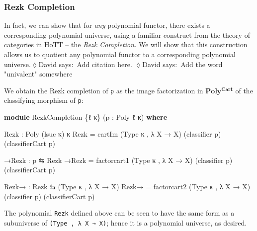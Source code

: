 \documentclass[
  11pt,
  oneside,
  article]{memoir}
\newenvironment{Shaded}{}{}
\newcommand{\KeywordTok}[1]{\textcolor[rgb]{0.00,0.44,0.13}{\textbf{#1}}}
\newcommand{\NormalTok}[1]{#1}
\newcommand{\OtherTok}[1]{\textcolor[rgb]{0.00,0.44,0.13}{#1}}
\theoremstyle{definition}
\theoremstyle{plain}
\newcommand{\0}{\textsf{0}}
\newcommand{\1}{\tn{\textsf{1}}}
\newcommand{\dnote}[1]{{\quad \color{blue}$\lozenge$\;David says:}~#1\;{\color{blue}$\lozenge$}\quad}
\begin{document}
\subsubsection{Rezk Completion}\label{rezk-completion}

In fact, we can show that for \emph{any} polynomial functor, there
exists a corresponding polynomial universe, using a familiar construct
from the theory of categories in HoTT -- the \emph{Rezk Completion.} We
will show that this construction allows us to quotient any polynomial
functor to a corresponding polynomial universe.\dnote{Add citation here.} \dnote{Add the word "univalent" somewhere}

We obtain the Rezk completion of \texttt{p} as the image factorization
in \(\mathbf{Poly^{Cart}}\) of the classifying morphism of \texttt{p}:

\begin{Shaded}
\begin{Highlighting}[]
\KeywordTok{module}\NormalTok{ RezkCompletion }\OtherTok{\{}\NormalTok{ℓ κ}\OtherTok{\}} \OtherTok{(}\NormalTok{p }\OtherTok{:}\NormalTok{ Poly ℓ κ}\OtherTok{)} \KeywordTok{where}

\NormalTok{    Rezk }\OtherTok{:}\NormalTok{ Poly }\OtherTok{(}\NormalTok{lsuc κ}\OtherTok{)}\NormalTok{ κ}
\NormalTok{    Rezk }\OtherTok{=}\NormalTok{ cartIm }\OtherTok{(}\NormalTok{Type κ , }\OtherTok{λ}\NormalTok{ X }\OtherTok{→}\NormalTok{ X}\OtherTok{)} \OtherTok{(}\NormalTok{classifier p}\OtherTok{)} \OtherTok{(}\NormalTok{classifierCart p}\OtherTok{)}

\NormalTok{    →Rezk }\OtherTok{:}\NormalTok{ p ⇆ Rezk}
\NormalTok{    →Rezk }\OtherTok{=}\NormalTok{ factorcart1 }\OtherTok{(}\NormalTok{Type κ , }\OtherTok{λ}\NormalTok{ X }\OtherTok{→}\NormalTok{ X}\OtherTok{)} \OtherTok{(}\NormalTok{classifier p}\OtherTok{)} \OtherTok{(}\NormalTok{classifierCart p}\OtherTok{)}

\NormalTok{    Rezk→ }\OtherTok{:}\NormalTok{ Rezk ⇆ }\OtherTok{(}\NormalTok{Type κ , }\OtherTok{λ}\NormalTok{ X }\OtherTok{→}\NormalTok{ X}\OtherTok{)}
\NormalTok{    Rezk→ }\OtherTok{=}\NormalTok{ factorcart2 }\OtherTok{(}\NormalTok{Type κ , }\OtherTok{λ}\NormalTok{ X }\OtherTok{→}\NormalTok{ X}\OtherTok{)} \OtherTok{(}\NormalTok{classifier p}\OtherTok{)} \OtherTok{(}\NormalTok{classifierCart p}\OtherTok{)}
\end{Highlighting}
\end{Shaded}

The polynomial \texttt{Rezk} defined above can be seen to have the same
form as a subuniverse of \texttt{(Type\ ,\ λ\ X\ →\ X)}; hence it is a
polynomial universe, as desired.
\end{document}
